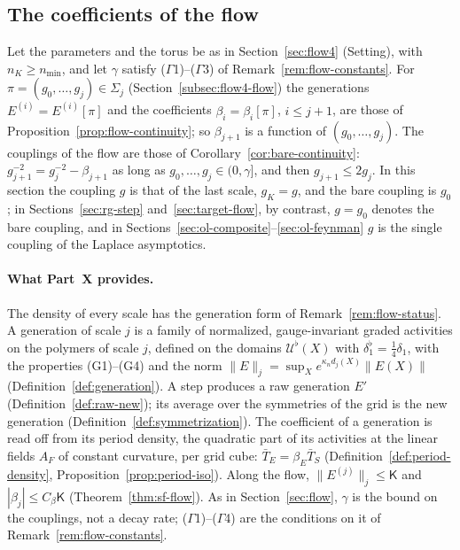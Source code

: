 \subsection{The coefficients of the flow}\label{subsec:ol-flow-coeff}

Let the parameters and the torus be as in Section~\ref{sec:flow4} (Setting), with $n_K\ge n_{\min}$, and let $\gamma$ satisfy ($\Gamma$1)--($\Gamma$3) of Remark~\ref{rem:flow-constants}. For $\pi=(g_0,\dots,g_j)\in\Sigma_j$ (Section~\ref{subsec:flow4-flow}) the generations $E^{(i)}=E^{(i)}[\pi]$ and the coefficients $\beta_i=\beta_i[\pi]$, $i\le j+1$, are those of Proposition~\ref{prop:flow-continuity}; so $\beta_{j+1}$ is a function of $(g_0,\dots,g_j)$. The couplings of the flow are those of Corollary~\ref{cor:bare-continuity}: $g_{j+1}^{-2}=g_j^{-2}-\beta_{j+1}$ as long as $g_0,\dots,g_j\in(0,\gamma]$, and then $g_{j+1}\le2g_j$. In this section the coupling $g$ is that of the last scale, $g_K=g$, and the bare coupling is $g_0$; in Sections~\ref{sec:rg-step} and~\ref{sec:target-flow}, by contrast, $g=g_0$ denotes the bare coupling, and in Sections~\ref{sec:ol-composite}--\ref{sec:ol-feynman} $g$ is the single coupling of the Laplace asymptotics.

\paragraph{What Part~X provides.} The density of every scale has the generation form of Remark~\ref{rem:flow-status}. A generation of scale $j$ is a family of normalized, gauge-invariant graded activities on the polymers of scale $j$, defined on the domains $\mathcal U^\flat(X)$ with $\delta_1^\flat=\frac14\delta_1$, with the properties (G1)--(G4) and the norm $\|E\|_j=\sup_Xe^{\kappa_nd_j(X)}\|E(X)\|$ (Definition~\ref{def:generation}). A step produces a raw generation $E'$ (Definition~\ref{def:raw-new}); its average over the symmetries of the grid is the new generation (Definition~\ref{def:symmetrization}). The coefficient of a generation is read off from its period density, the quadratic part of its activities at the linear fields $A_F$ of constant curvature, per grid cube: $\bar T_E=\beta_E\bar T_S$ (Definition~\ref{def:period-density}, Proposition~\ref{prop:period-iso}). Along the flow, $\|E^{(j)}\|_j\le\mathsf K$ and $|\beta_j|\le C_\beta\mathsf K$ (Theorem~\ref{thm:sf-flow}). As in Section~\ref{sec:flow}, $\gamma$ is the bound on the couplings, not a decay rate; ($\Gamma$1)--($\Gamma$4) are the conditions on it of Remark~\ref{rem:flow-constants}.

